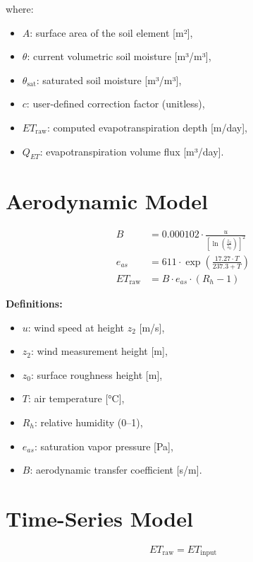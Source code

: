 \documentclass[12pt]{report}
\begin{document}
where:
\begin{itemize}
  \item \( A \): surface area of the soil element [m²],
  \item \( \theta \): current volumetric soil moisture [m³/m³],
  \item \( \theta_{\text{sat}} \): saturated soil moisture [m³/m³],
  \item \( c \): user-defined correction factor (unitless),
  \item \( ET_{\text{raw}} \): computed evapotranspiration depth [m/day],
  \item \( Q_{ET} \): evapotranspiration volume flux [m³/day].
\end{itemize}

\section{Aerodynamic Model}

\begin{align}
B &= 0.000102 \cdot \frac{u}{\left[\ln\left(\frac{z_2}{z_0}\right)\right]^2} \\
e_{as} &= 611 \cdot \exp\left(\frac{17.27 \cdot T}{237.3 + T}\right) \\
ET_{\text{raw}} &= B \cdot e_{as} \cdot (R_h - 1)
\end{align}

\textbf{Definitions:}
\begin{itemize}
  \item \( u \): wind speed at height \( z_2 \) [m/s],
  \item \( z_2 \): wind measurement height [m],
  \item \( z_0 \): surface roughness height [m],
  \item \( T \): air temperature [°C],
  \item \( R_h \): relative humidity (0–1),
  \item \( e_{as} \): saturation vapor pressure [Pa],
  \item \( B \): aerodynamic transfer coefficient [s/m].
\end{itemize}

\section{Time-Series Model}

\begin{equation}
ET_{\text{raw}} = ET_{\text{input}}
\end{equation}
\end{document}
